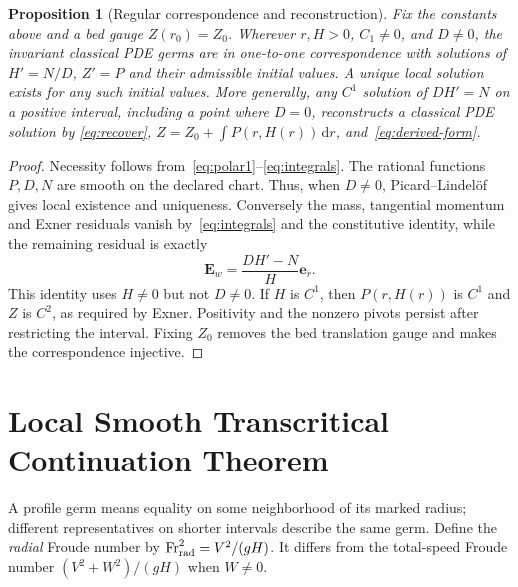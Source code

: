 \documentclass[11pt]{article}
\newtheorem{proposition}[theorem]{Proposition}
\theoremstyle{remark}\newtheorem{remark}[theorem]{Remark}
\newcommand{\dd}{\,\mathrm d}
\begin{document}
\begin{proposition}[Regular correspondence and reconstruction]\label{prop:regular}
Fix the constants above and a bed gauge $Z(r_0)=Z_0$. Wherever $r,H>0$,
$C_1\ne0$, and $D\ne0$, the invariant classical PDE germs are in one-to-one
correspondence with solutions of $H'=N/D$, $Z'=P$ and their admissible initial
values. A unique local solution exists for any such initial values.
More generally, \emph{any} $C^1$ solution of $DH'=N$ on a positive interval,
including a point where $D=0$, reconstructs a classical PDE solution by
\eqref{eq:recover}, $Z=Z_0+\int P(r,H(r))\dd r$, and~\eqref{eq:derived-form}.
\end{proposition}
\begin{proof}
Necessity follows from~\eqref{eq:polar1}--\eqref{eq:integrals}. The rational
functions $P,D,N$ are smooth on the declared chart. Thus, when $D\ne0$,
Picard--Lindel\"of gives local existence and uniqueness. Conversely the mass,
tangential momentum and Exner residuals vanish by~\eqref{eq:integrals} and
the constitutive identity, while the remaining residual is exactly
\begin{equation}
\mathbf E_w=\frac{DH'-N}{H}\mathbf e_r.\label{eq:reconstruction-residual}
\end{equation}
This identity uses $H\ne0$ but not $D\ne0$. If $H$ is $C^1$, then $P(r,H(r))$
is $C^1$ and $Z$ is $C^2$, as required by Exner. Positivity and the nonzero
pivots persist after restricting the interval. Fixing $Z_0$ removes the bed
translation gauge and makes the correspondence injective.
\end{proof}

\section{Local Smooth Transcritical Continuation Theorem}
A profile germ means equality on some neighborhood of its marked radius;
different representatives on shorter intervals describe the same germ.
Define the \emph{radial} Froude number by
$\mathrm{Fr}_{\rm rad}^2=V^2/(gH)$. It differs from the total-speed Froude
number $(V^2+W^2)/(gH)$ when $W\ne0$.
\end{document}
